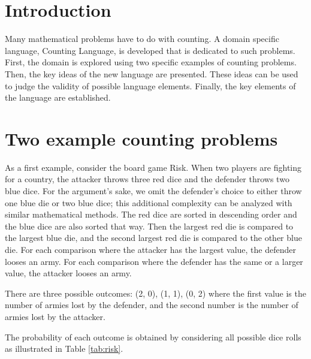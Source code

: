 \documentclass{article}
\begin{document}
\section{Introduction}

Many mathematical problems have to do with counting. A domain specific language, Counting Language, is developed that is dedicated to such problems. First, the domain is explored using two specific examples of counting problems. Then, the key ideas of the new language are presented. These ideas can be used to judge the validity of possible language elements. Finally, the key elements of the language are established.

\section{Two example counting problems}

As a first example, consider the board game Risk. When two players are fighting for a country, the attacker throws three red dice and the defender throws two blue dice. For the argument's sake, we omit the defender's choice to either throw one blue die or two blue dice; this additional complexity can be analyzed with similar mathematical methods. The red dice are sorted in descending order and the blue dice are also sorted that way. Then the largest red die is compared to the largest blue die, and the second largest red die is compared to the other blue die. For each comparison where the attacker has the largest value, the defender looses an army. For each comparison where the defender has the same or a larger value, the attacker looses an army.

There are three possible outcomes: (2, 0), (1, 1), (0, 2) where the first value is the number of armies lost by the defender, and the second number is the number of armies lost by the attacker.

The probability of each outcome is obtained by considering all possible dice rolls as illustrated in Table \ref{tab:risk}.
\end{document}

